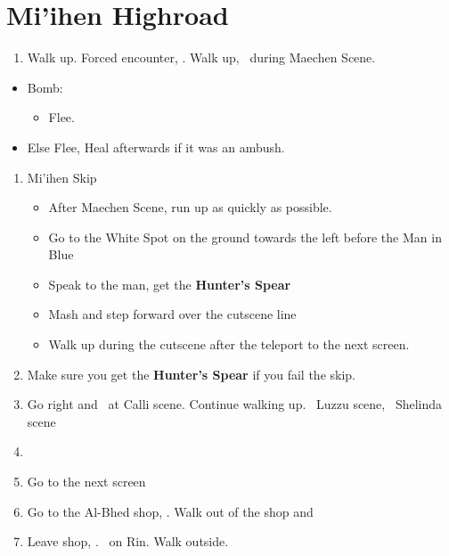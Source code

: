\chapter{Mi'ihen Highroad}

\begin{enumerate}
  \item Walk up. Forced encounter, \sd. Walk up, \sd\ during Maechen Scene.
\end{enumerate}
\begin{encounters}
  \begin{itemize}
    \item Bomb:
          \begin{itemize}
            \kimahrif Lancet Bomb, learn \textbf{Self Destruct}
            \item Flee.
          \end{itemize}
    \item Else Flee,  Heal afterwards if it was an ambush.
  \end{itemize}
\end{encounters}
\newpage
\begin{enumerate}[resume]
  \item {Mi'ihen Skip}
        \begin{itemize}
          \item After Maechen Scene, run up as quickly as possible.
          \item Go to the White Spot on the ground towards the left before the Man in Blue
          \item Speak to the man, get the \textbf{Hunter's Spear}
          \item Mash and step forward over the cutscene line
          \item Walk up during the cutscene after the teleport to the next screen.
        \end{itemize}
  \item Make sure you get the \textbf{Hunter's Spear} if you fail the skip.
  \item Go right and \sd\ at Calli scene. Continue walking up. \sd\ Luzzu scene, \sd\ Shelinda scene
  \item \formation{\tidus}{\wakka}{\kimahri}
  \item Go to the next screen
  \item Go to the Al-Bhed shop, \sd. Walk out of the shop and \cs[5:30]
  \item Leave shop, \sd. \sd\ on Rin. Walk outside.
\end{enumerate}

